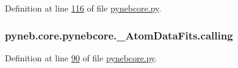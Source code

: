 Definition at line \hyperlink{pynebcore_8py_source_l00116}{116} of file \hyperlink{pynebcore_8py_source}{pynebcore.\+py}.

\hypertarget{classpyneb_1_1core_1_1pynebcore_1_1___atom_data_fits_a70465eedf1ac0b8e43360bc423be9c93}{}
\subsubsection[{calling}]{\setlength{\rightskip}{0pt plus 5cm}pyneb.\+core.\+pynebcore.\+\_\+\+Atom\+Data\+Fits.\+calling}\label{classpyneb_1_1core_1_1pynebcore_1_1___atom_data_fits_a70465eedf1ac0b8e43360bc423be9c93}


Definition at line \hyperlink{pynebcore_8py_source_l00090}{90} of file \hyperlink{pynebcore_8py_source}{pynebcore.\+py}.



